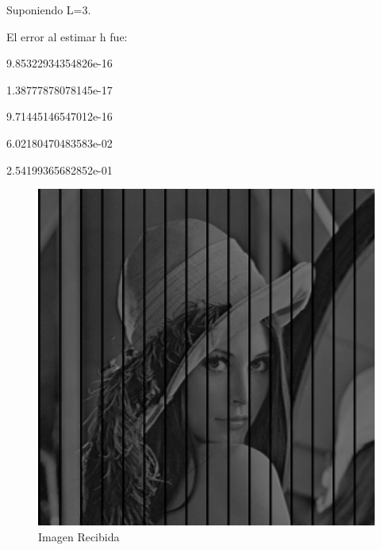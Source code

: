 \documentclass{article}
\begin{document}
\begin{multicols}{2}
\begin{figure}[H]
\end{figure}



\par \large{Suponiendo L=3.}

\par El error al estimar h fue:\\ 
\par   9.85322934354826e-16
\par   1.38777878078145e-17
\par   9.71445146547012e-16
\par   6.02180470483583e-02
\par   2.54199365682852e-01\\

\begin{figure}[H]
\centering
\includegraphics[scale=0.2]{../img/received_part6_3b.png}
\caption{Imagen Recibida}

\end{figure}


\end{multicols}
\end{document}
